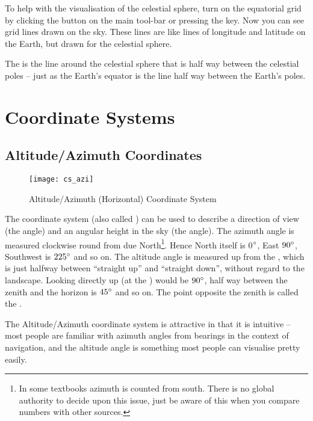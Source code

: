 To help with the visualisation of the celestial sphere, turn on the
equatorial grid by clicking the button on the main tool-bar or pressing
the  key. Now you can see grid lines drawn on the sky. These
lines are like lines of longitude and latitude on the Earth, but drawn
for the celestial sphere.

The  is the line around the celestial sphere
that is half way between the celestial poles -- just as the Earth's
equator is the line half way between the Earth's poles.




\section{Coordinate Systems}
\label{sec:Concepts:CoordinateSystems}

\subsection{Altitude/Azimuth Coordinates}
\label{sec:Concepts:AltAz}

\begin{figure}[ht]
\centering\texttt{[image: cs\_azi]}
\caption{Altitude/Azimuth (Horizontal) Coordinate System}
\label{fig:AltAz}
\end{figure}

The  coordinate system (also called
) can be used to describe a
direction of view (the  angle) and an angular
height in the sky (the  angle). The azimuth angle
is measured clockwise round from due North\footnote{In some textbooks
  azimuth is counted from south. There is no global authority to
  decide upon this issue, just be aware of this when you compare
  numbers with other sources.}. Hence North itself is 0$\degree$, East
$90\degree$, Southwest is $225\degree$ and so on.  The altitude angle
is measured up from the , which is
just halfway between ``straight up'' and ``straight down'', without
regard to the landscape. Looking directly up (at the
) would be $90\degree$, half way between the zenith
and the horizon is $45\degree$ and so on. The point opposite the
zenith is called the .

The Altitude/Azimuth coordinate system is attractive in that it is
intuitive -- most people are familiar with azimuth angles from bearings
in the context of navigation, and the altitude angle is something most
people can visualise pretty easily.

